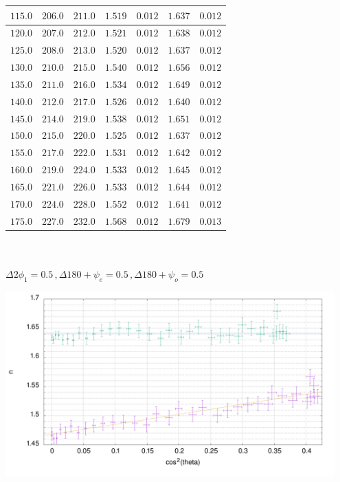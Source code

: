 \begin{center}
\begin{tabular}{|c|c|c|c|c|c|c|}
$115.0$&$206.0$&$211.0$&$1.519$&$0.012$&$1.637$&$0.012$\\\hline
$120.0$&$207.0$&$212.0$&$1.521$&$0.012$&$1.638$&$0.012$\\\hline
$125.0$&$208.0$&$213.0$&$1.520$&$0.012$&$1.637$&$0.012$\\\hline
$130.0$&$210.0$&$215.0$&$1.540$&$0.012$&$1.656$&$0.012$\\\hline
$135.0$&$211.0$&$216.0$&$1.534$&$0.012$&$1.649$&$0.012$\\\hline
$140.0$&$212.0$&$217.0$&$1.526$&$0.012$&$1.640$&$0.012$\\\hline
$145.0$&$214.0$&$219.0$&$1.538$&$0.012$&$1.651$&$0.012$\\\hline
$150.0$&$215.0$&$220.0$&$1.525$&$0.012$&$1.637$&$0.012$\\\hline
$155.0$&$217.0$&$222.0$&$1.531$&$0.012$&$1.642$&$0.012$\\\hline
$160.0$&$219.0$&$224.0$&$1.533$&$0.012$&$1.645$&$0.012$\\\hline
$165.0$&$221.0$&$226.0$&$1.533$&$0.012$&$1.644$&$0.012$\\\hline
$170.0$&$224.0$&$228.0$&$1.552$&$0.012$&$1.641$&$0.012$\\\hline
$175.0$&$227.0$&$232.0$&$1.568$&$0.012$&$1.679$&$0.013$\\\hline
\end{tabular}\\~\\
$\Delta 2 \phi_1=0.5\,\text{}, \Delta 180+\psi_e=0.5\,\text{}, \Delta 180+\psi_o=0.5\,\text{}$
\end{center}



\begin{center}
\includegraphics[width=0.95\textwidth]{down_up.png}
\end{center}

